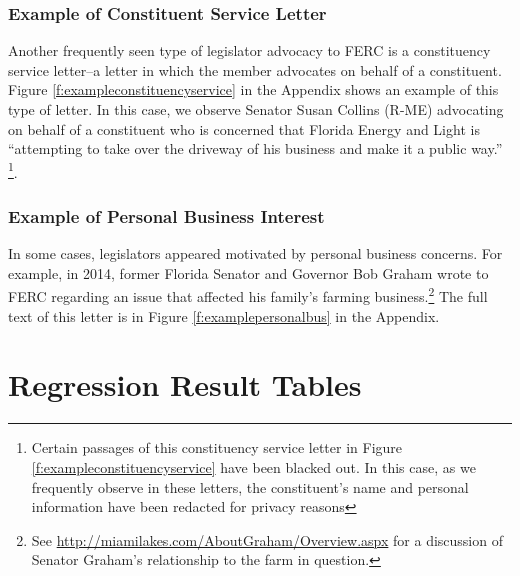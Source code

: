 \documentclass{article}
\begin{document}
\subsubsection{Example of Constituent Service Letter}

Another frequently seen type of legislator advocacy to FERC is a constituency service letter--a letter in which the member advocates on behalf of a constituent.  Figure \ref{f:exampleconstituencyservice} in the Appendix shows an example of this type of letter. 
In this case, we observe Senator Susan Collins (R-ME) advocating on behalf of a constituent who is concerned that Florida Energy and Light is ``attempting to take over the driveway of his business and make it a public way.'' \footnote{Certain passages of this constituency service letter in Figure \ref{f:exampleconstituencyservice} have been blacked out. In this case, as we frequently observe in these letters, the constituent's name and personal information have been redacted for privacy reasons}. 


\subsubsection{Example of Personal Business Interest}

In some cases, legislators appeared motivated by personal business concerns.  For example, in 2014, former Florida Senator and Governor Bob Graham wrote to FERC regarding an issue that affected his family's farming business.\footnote{See  \url{http://miamilakes.com/AboutGraham/Overview.aspx} for a discussion of Senator Graham's relationship to the farm in question.}  The full text of this letter is in Figure \ref{f:examplepersonalbus} in the Appendix.


\clearpage
\section{Regression Result Tables}

\begin{table}[ht!]
    \centering
  

  \caption{\textbf{Table \ref{tab:bimoney}: Bivariate Models - Campaign Contributions and Letter-writing to FERC}. Bivariate Poisson Regression models predicting letter-writing activity to FERC using campaign contributions from the energy industry.}\label{tab:bimoney}
\end{table}

\begin{table}[ht!]
    \centering

  \caption{\textbf{Table \ref{tab:biparty}: Bivariate Models - Party and Letter-writing to FERC}. Bivariate Poisson Regression models predicting letter-writing activity to FERC using Legislator's Party.}\label{tab:biparty}
\end{table}
\end{document}
